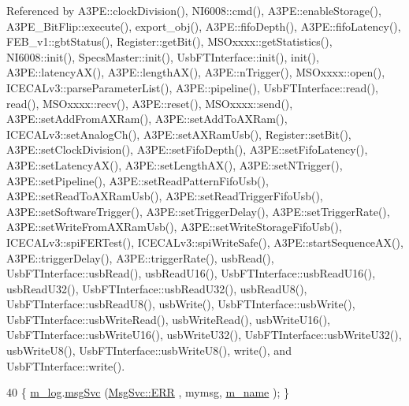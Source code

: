 Referenced by A3\+P\+E\+::clock\+Division(), N\+I6008\+::cmd(), A3\+P\+E\+::enable\+Storage(), A3\+P\+E\+\_\+\+Bit\+Flip\+::execute(), export\+\_\+obj(), A3\+P\+E\+::fifo\+Depth(), A3\+P\+E\+::fifo\+Latency(), F\+E\+B\+\_\+v1\+::gbt\+Status(), Register\+::get\+Bit(), M\+S\+Oxxxx\+::get\+Statistics(), N\+I6008\+::init(), Specs\+Master\+::init(), Usb\+F\+T\+Interface\+::init(), init(), A3\+P\+E\+::latency\+A\+X(), A3\+P\+E\+::length\+A\+X(), A3\+P\+E\+::n\+Trigger(), M\+S\+Oxxxx\+::open(), I\+C\+E\+C\+A\+Lv3\+::parse\+Parameter\+List(), A3\+P\+E\+::pipeline(), Usb\+F\+T\+Interface\+::read(), read(), M\+S\+Oxxxx\+::recv(), A3\+P\+E\+::reset(), M\+S\+Oxxxx\+::send(), A3\+P\+E\+::set\+Add\+From\+A\+X\+Ram(), A3\+P\+E\+::set\+Add\+To\+A\+X\+Ram(), I\+C\+E\+C\+A\+Lv3\+::set\+Analog\+Ch(), A3\+P\+E\+::set\+A\+X\+Ram\+Usb(), Register\+::set\+Bit(), A3\+P\+E\+::set\+Clock\+Division(), A3\+P\+E\+::set\+Fifo\+Depth(), A3\+P\+E\+::set\+Fifo\+Latency(), A3\+P\+E\+::set\+Latency\+A\+X(), A3\+P\+E\+::set\+Length\+A\+X(), A3\+P\+E\+::set\+N\+Trigger(), A3\+P\+E\+::set\+Pipeline(), A3\+P\+E\+::set\+Read\+Pattern\+Fifo\+Usb(), A3\+P\+E\+::set\+Read\+To\+A\+X\+Ram\+Usb(), A3\+P\+E\+::set\+Read\+Trigger\+Fifo\+Usb(), A3\+P\+E\+::set\+Software\+Trigger(), A3\+P\+E\+::set\+Trigger\+Delay(), A3\+P\+E\+::set\+Trigger\+Rate(), A3\+P\+E\+::set\+Write\+From\+A\+X\+Ram\+Usb(), A3\+P\+E\+::set\+Write\+Storage\+Fifo\+Usb(), I\+C\+E\+C\+A\+Lv3\+::spi\+F\+E\+R\+Test(), I\+C\+E\+C\+A\+Lv3\+::spi\+Write\+Safe(), A3\+P\+E\+::start\+Sequence\+A\+X(), A3\+P\+E\+::trigger\+Delay(), A3\+P\+E\+::trigger\+Rate(), usb\+Read(), Usb\+F\+T\+Interface\+::usb\+Read(), usb\+Read\+U16(), Usb\+F\+T\+Interface\+::usb\+Read\+U16(), usb\+Read\+U32(), Usb\+F\+T\+Interface\+::usb\+Read\+U32(), usb\+Read\+U8(), Usb\+F\+T\+Interface\+::usb\+Read\+U8(), usb\+Write(), Usb\+F\+T\+Interface\+::usb\+Write(), Usb\+F\+T\+Interface\+::usb\+Write\+Read(), usb\+Write\+Read(), usb\+Write\+U16(), Usb\+F\+T\+Interface\+::usb\+Write\+U16(), usb\+Write\+U32(), Usb\+F\+T\+Interface\+::usb\+Write\+U32(), usb\+Write\+U8(), Usb\+F\+T\+Interface\+::usb\+Write\+U8(), write(), and Usb\+F\+T\+Interface\+::write().


\begin{DoxyCode}
40 \{ \hyperlink{classObject_a0d269813dd7ac1f24bc143031e2963f2}{m\_log}.\hyperlink{classMsgSvc_ad25f18047920cc59a314e5098259711c}{msgSvc} (\hyperlink{classMsgSvc_ae671eb7301996cd049d2da8a65925926a35a9d7166e9896af4ec8fb33bf5f1772}{MsgSvc::ERR}     , mymsg, \hyperlink{classObject_a8b83c95c705d2c3ba0d081fe1710f48d}{m\_name} ); \}
\end{DoxyCode}
\mbox{\label{classObject_ad7f6c457733082efa2f9ff5f5c8e119a}} 
